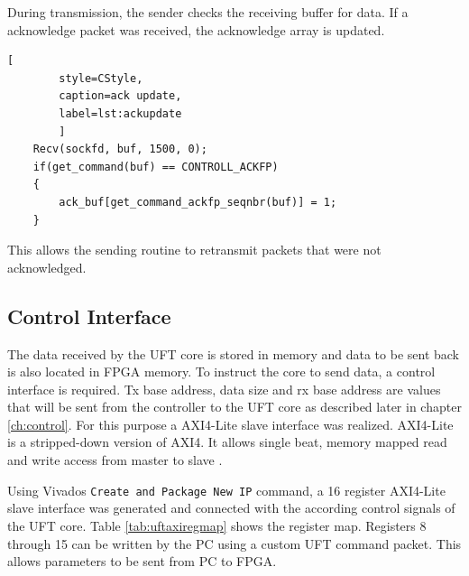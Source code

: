 During transmission, the sender checks the receiving buffer for data. If a
acknowledge packet was received, the acknowledge array is updated.

\begin{minipage}{\linewidth}
    \begin{lstlisting}[
        style=CStyle, 
        caption=ack update, 
        label=lst:ackupdate
        ]
    Recv(sockfd, buf, 1500, 0);
    if(get_command(buf) == CONTROLL_ACKFP)
    {
        ack_buf[get_command_ackfp_seqnbr(buf)] = 1;
    }\end{lstlisting}
\end{minipage}

This allows the sending routine to retransmit packets that were not
acknowledged.

\subsection{Control Interface}
The data received by the UFT core is stored in memory and data to be sent back
is also located in FPGA memory. To instruct the core to send data, a control
interface is required. Tx base address, data size and rx base address are values
that will be sent from the controller to the UFT core as described later in
chapter \ref{ch:control}. For this purpose a AXI4-Lite slave interface was
realized. AXI4-Lite is a stripped-down version of AXI4. It allows single beat,
memory mapped read and write access from master to slave \cite{axispecs}.

Using Vivados \texttt{Create and Package New IP} command, a 16 register
AXI4-Lite slave interface was generated and connected with the according control
signals of the UFT core. Table \ref{tab:uftaxiregmap} shows the register map.
Registers 8 through 15 can be written by the PC using a custom UFT command
packet. This allows parameters to be sent from PC to FPGA.

